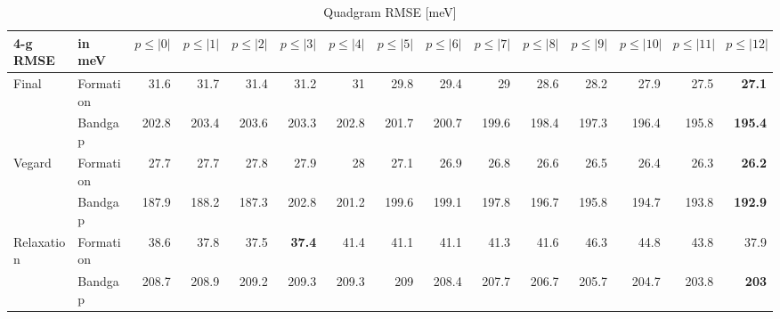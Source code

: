 \documentclass[11pt,oneside,czech,american]{book} %
\theoremstyle{definition} %
\theoremstyle{definition}
\begin{document}
\begin{table}[H]
	\scriptsize
	\centering
\begin{tabular}{llrrrrrrrrrrrrr}
	\hline
	4-g RMSE   & in meV    &   $p{\leq}|0|$ &   $p{\leq}|1|$ &   $p{\leq}|2|$ &   $p{\leq}|3|$ &   $p{\leq}|4|$ &   $p{\leq}|5|$ &   $p{\leq}|6|$ &   $p{\leq}|7|$ &   $p{\leq}|8|$ &   $p{\leq}|9|$ &   $p{\leq}|10|$ &   $p{\leq}|11|$ &   $p{\leq}|12|$ \\
	\hline
	\multirow{2}{*}{Final}      & Formation &       31.6 &       31.7 &       31.4 &       31.2 &       31   &       29.8 &       29.4 &       29   &       28.6 &       28.2 &        27.9 &        27.5 &        \textbf{27.1} \\
	      & Bandgap   &      202.8 &      203.4 &      203.6 &      203.3 &      202.8 &      201.7 &      200.7 &      199.6 &      198.4 &      197.3 &       196.4 &       195.8 &       \textbf{195.4} \\
	\multirow{2}{*}{Vegard}     & Formation &       27.7 &       27.7 &       27.8 &       27.9 &       28   &       27.1 &       26.9 &       26.8 &       26.6 &       26.5 &        26.4 &        26.3 &        \textbf{26.2} \\
	     & Bandgap   &      187.9 &      188.2 &      187.3 &      202.8 &      201.2 &      199.6 &      199.1 &      197.8 &      196.7 &      195.8 &       194.7 &       193.8 &       \textbf{192.9} \\
	\multirow{2}{*}{Relaxation} & Formation &       38.6 &       37.8 &       37.5 &       \textbf{37.4} &       41.4 &       41.1 &       41.1 &       41.3 &       41.6 &       46.3 &        44.8 &        43.8 &        37.9 \\
	 & Bandgap   &      208.7 &      208.9 &      209.2 &      209.3 &      209.3 &      209   &      208.4 &      207.7 &      206.7 &      205.7 &       204.7 &       203.8 &       \textbf{203}   \\
	\hline
\end{tabular}
	\caption{Quadgram RMSE [meV]}
	\label{4-g RMSE hat}
\end{table}
\end{document}
